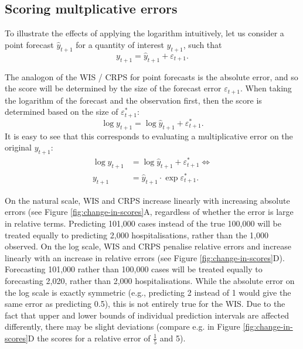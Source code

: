 \documentclass{article}
\begin{document}
\subsection{Scoring multplicative errors}

To illustrate the effects of applying the logarithm intuitively, let us consider a point forecast $\hat{y}_{t+1}$ for a quantity of interest $y_{t+1}$, such that 
\begin{equation}
y_{t+1} = \hat{y}_{t+1} + \varepsilon_{t+1}.
\end{equation}

The analogon of the WIS / CRPS for point forecasts is the absolute error, and so the score will be determined by the size of the forecast error $\varepsilon_{t+1}$. When taking the logarithm of the forecast and the observation first, then the score is determined based on the size of $\varepsilon^*_{t+1}$: 
\begin{equation}
\log y_{t+1} = \log \hat{y}_{t+1} + \varepsilon^*_{t+1}.
\end{equation}
%
It is easy to see that this corresponds to evaluating a multiplicative error on the original $y_{t+1}$:
%
\begin{align}
\log y_{t+1} &= \log \hat{y}_{t+1} + \varepsilon^*_{t+1} \Leftrightarrow \\    
y_{t+1} &= \hat{y}_{t+1} \cdot \exp{\varepsilon^*_{t+1}}.    
\end{align}

On the natural scale, WIS and CRPS increase linearly with increasing absolute errors (see Figure \ref{fig:change-in-scores}A, regardless of whether the error is large in relative terms. Predicting 101,000 cases instead of the true 100,000 will be treated equally to predicting 2,000 hospitalisations, rather than the 1,000 observed. On the log scale, WIS and CRPS penalise relative errors and increase linearly with an increase in relative errors (see Figure \ref{fig:change-in-scores}D). Forecasting 101,000 rather than 100,000 cases will be treated equally to forecasting 2,020, rather than 2,000 hospitalisations. While the absolute error on the log scale is exactly symmetric (e.g., predicting 2 instead of 1 would give the same error as predicting 0.5), this is not entirely true for the WIS. Due to the fact that upper and lower bounds of individual prediction intervals are affected differently, there may be slight deviations (compare e.g. in Figure \ref{fig:change-in-scores}D the scores for a relative error of $\frac{1}{5}$ and 5). 
\end{document}
